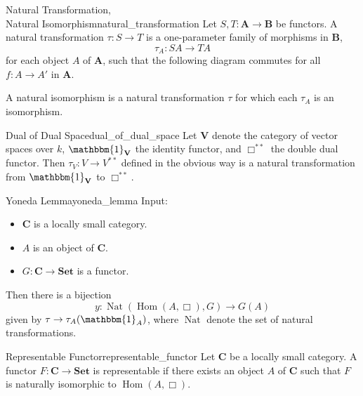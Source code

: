 \documentclass{article}
\begin{document}
\begin{definition}{Natural Transformation, \\ Natural Isomorphism}{natural_transformation}
    Let $S,T: \mathbf{A} \rightarrow \mathbf{B}$ be functors.
    A natural transformation $\tau:S\rightarrow T$ is a one-parameter family of morphisms in $\mathbf{B}$,
    \[ \tau_A: SA \rightarrow TA \]
    for each object $A$ of $\mathbf{A}$, such that the following diagram commutes for all $f:A\rightarrow A'$ in $\mathbf{A}$.
    \begin{center}
    \end{center}
    A natural isomorphism is a natural transformation $\tau$ for which each $\tau_A$ is an isomorphism.
\end{definition}

\begin{example}{Dual of Dual Space}{dual_of_dual_space}
    Let $\mathbf{V}$ denote the category of vector spaces over $k$, $\mathbbm{1}_{\mathbf{V}}$ the identity functor, and $\Box^{**}$ the double dual functor.
    Then $\tau_V: V \rightarrow V^{**}$ defined in the obvious way is a natural transformation from $\mathbbm{1}_{\mathbf{V}}$ to $\Box^{**}$.
\end{example}

\begin{theorem}{Yoneda Lemma}{yoneda_lemma}
    Input:
    \begin{itemize}
        \item $\mathbf{C}$ is a locally small category.
        \item $A$ is an object of $\mathbf{C}$.
        \item $G:\mathbf{C}\rightarrow \mathbf{Set}$ is a functor.
    \end{itemize}
    Then there is a bijection
    \[ y: \operatorname{Nat}(\operatorname{Hom}(A,\Box), G) \rightarrow G(A) \]
    given by $\tau \rightarrow \tau_A(\mathbbm{1}_A)$, where $\operatorname{Nat}$ denote the set of natural transformations.
\end{theorem}

\begin{definition}{Representable Functor}{representable_functor}
    Let $\mathbf{C}$ be a locally small category.
    A functor $F:\mathbf{C}\rightarrow \mathbf{Set}$ is representable if there exists an object $A$ of $\mathbf{C}$ such that $F$ is naturally isomorphic to $\operatorname{Hom}(A,\Box)$.
\end{definition}
\end{document}
